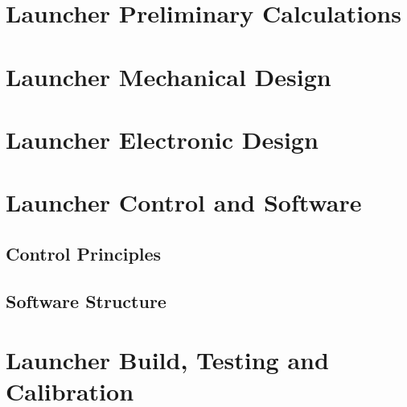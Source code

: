 \section{Launcher Preliminary Calculations}
\label{sec:Launcher Preliminary Calculations}

\clearpage
\section{Launcher Mechanical Design}
\label{sec:Launcher Mechanical Design}

\clearpage
\section{Launcher Electronic Design}
\label{sec:Launcher Electronic Design}
  

\clearpage
\section{Launcher Control and Software}
\label{sec:Launcher Control and Software}
  \subsection{Control Principles}
  \label{sub:Control Principles}
  \subsection{Software Structure}
  \label{sub:Software Structure}


\clearpage
\section{Launcher Build, Testing and Calibration}
\label{sec:Launcher Build, Testing and Calibration}

